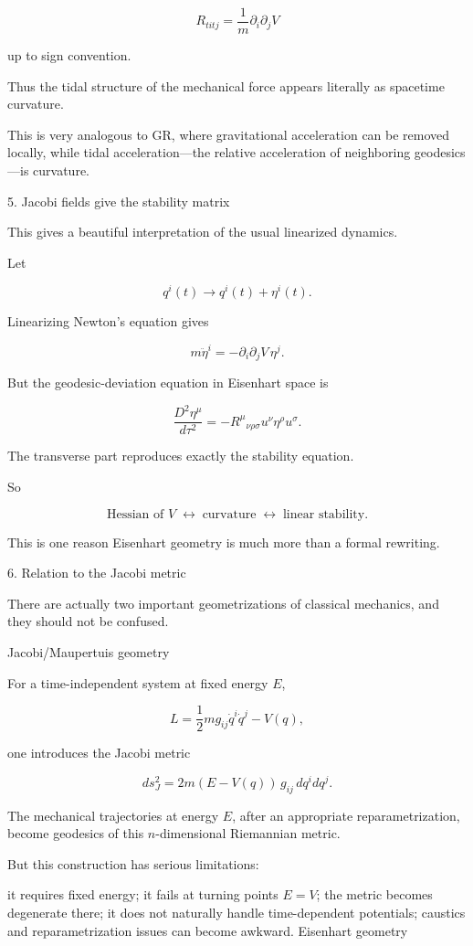 $$ \boxed{ R_{titj} = \frac{1}{m}\partial_i\partial_j V } $$

up to sign convention.

Thus the tidal structure of the mechanical force appears literally as spacetime curvature.

This is very analogous to GR, where gravitational acceleration can be removed locally, while tidal acceleration—the relative acceleration of neighboring geodesics—is curvature.

5. Jacobi fields give the stability matrix

This gives a beautiful interpretation of the usual linearized dynamics.

Let

$$ q^i(t)\rightarrow q^i(t)+\eta^i(t). $$

Linearizing Newton's equation gives

$$ m\ddot\eta^i = -\partial_i\partial_jV\,\eta^j. $$

But the geodesic-deviation equation in Eisenhart space is

$$ \frac{D^2\eta^\mu}{d\tau^2} = -R^\mu{}_{\nu\rho\sigma} u^\nu\eta^\rho u^\sigma. $$

The transverse part reproduces exactly the stability equation.

So

$$ \boxed{ \text{Hessian of }V \;\longleftrightarrow\; \text{curvature} \;\longleftrightarrow\; \text{linear stability}. } $$

This is one reason Eisenhart geometry is much more than a formal rewriting.

6. Relation to the Jacobi metric

There are actually two important geometrizations of classical mechanics, and they should not be confused.

Jacobi/Maupertuis geometry

For a time-independent system at fixed energy \(E\),

$$ L=\frac12m g_{ij}\dot q^i\dot q^j-V(q), $$

one introduces the Jacobi metric

$$ \boxed{ ds_J^2 = 2m(E-V(q))\,g_{ij}\,dq^i dq^j. } $$

The mechanical trajectories at energy \(E\), after an appropriate reparametrization, become geodesics of this \(n\)-dimensional Riemannian metric.

But this construction has serious limitations:

it requires fixed energy;
it fails at turning points \(E=V\);
the metric becomes degenerate there;
it does not naturally handle time-dependent potentials;
caustics and reparametrization issues can become awkward.
Eisenhart geometry

